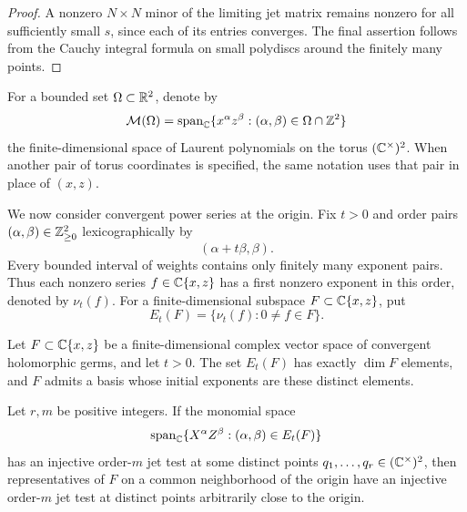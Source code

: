 \begin{proof}
A nonzero $N\times N$ minor of the limiting jet matrix remains nonzero
for all sufficiently small $s$, since each of its entries converges.
The final assertion follows from the Cauchy integral formula on small
polydiscs around the finitely many points.
\end{proof}

For a bounded set $\Omega\subset\mathbb R^2$, denote by
\[
 \mathcal M(\Omega)
 =\operatorname{span}_{\mathbb C}\{x^\alpha z^\beta:
                 (\alpha,\beta)\in\Omega\cap\mathbb Z^2\}
\]
the finite-dimensional space of Laurent polynomials on the torus
$(\mathbb C^\times)^2$.  When another pair of torus coordinates is specified,
the same notation uses that pair in place of $(x,z)$.

We now consider convergent power series at the origin.  Fix $t>0$ and
order pairs $(\alpha,\beta)\in\mathbb Z_{\ge0}^2$ lexicographically by
\[
 (\alpha+t\beta,\beta).
\]
Every bounded interval of weights contains only finitely many exponent
pairs.  Thus each nonzero series $f\in\mathbb C\{x,z\}$ has a first nonzero
exponent in this order, denoted by $\nu_t(f)$.  For a finite-dimensional
subspace $F\subset\mathbb C\{x,z\}$, put
\[
 E_t(F)=\{\nu_t(f):0\ne f\in F\}.
\]

\begin{proposition}
\label{prop:initial-transfer}
Let $F\subset\mathbb C\{x,z\}$ be a finite-dimensional complex vector space
of convergent holomorphic germs, and let $t>0$.  The set $E_t(F)$ has
exactly $\dim F$ elements, and $F$ admits a basis whose initial exponents
are these distinct elements.

Let $r,m$ be positive integers.  If the monomial space
\[
 \operatorname{span}_{\mathbb C}\{X^\alpha Z^\beta:(\alpha,\beta)\in E_t(F)\}
\]
has an injective order-$m$ jet test at some distinct points
$q_1,\ldots,q_r\in(\mathbb C^\times)^2$, then representatives of $F$ on a common
neighborhood of the origin have an injective order-$m$ jet test at
distinct points arbitrarily close to the origin.
\end{proposition}

